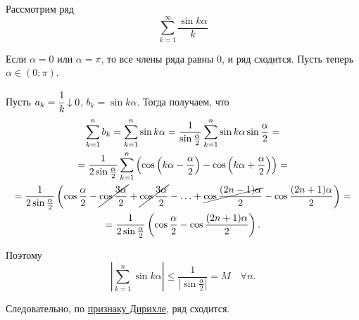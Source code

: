 \documentclass[../../main.tex]{subfiles}
\begin{document}
	\begin{example}
		Рассмотрим ряд
		\[\sum_{k = 1}^\infty\frac{\sin k\alpha}{k}\]
		
		Если $\alpha = 0$ или $\alpha = \pi$, то все члены ряда равны 0, 
		и ряд сходится. Пусть теперь $\alpha\in (0;\pi)$. 
		
		Пусть $a_k = \cfrac{1}{k}\downarrow 0$, $b_k = \sin k\alpha$. 
		Тогда получаем, что
		\begin{gather*}
			\sum_{k = 1}^n b_k = \sum_{k = 1}^n\sin k\alpha =
			\frac{1}{\sin\frac{\alpha}{2}}
			\sum_{k = 1}^n \sin k\alpha\sin\frac{\alpha}{2} = \\
			= \frac{1}{2\sin\frac{\alpha}{2}}
			\sum_{k = 1}^n\left(\cos\left(k\alpha - \frac{\alpha}{2}\right) - 
			\cos\left(k\alpha + \frac{\alpha}{2}\right)\right) = \\
			= \frac{1}{2\sin\frac{\alpha}{2}}\left(\cos\frac{\alpha}{2} - 
			\cancel{\cos\frac{3\alpha}{2}} + \cancel{\cos\frac{3\alpha}{2}} - 
			\ldots + \cancel{\cos\frac{(2n - 1)\alpha}{2}} - 
			\cos\frac{(2n + 1)\alpha}{2}\right) = \\
			= \frac{1}{2\sin\frac{\alpha}{2}}\left(\cos\frac{\alpha}{2} - 
			\cos\frac{(2n + 1)\alpha}{2}\right).
		\end{gather*}
		
		Поэтому
		\[\left|\sum_{k = 1}^n \sin k\alpha\right|\leq 
		\frac{1}{\left|\sin\frac{\alpha}{2}\right|} = M\quad \forall n.\]
		
		Следовательно, по \hyperref[29:dirichle]{признаку Дирихле}, ряд сходится.
	\end{example}
\end{document}
